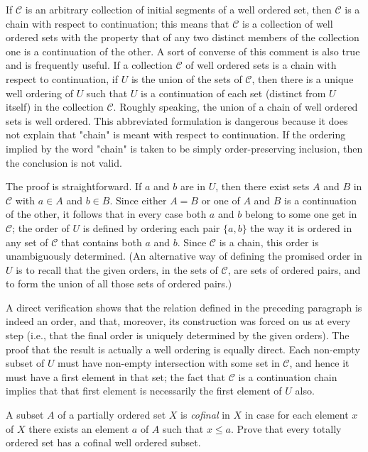 If $\mathcal{C}$ is an arbitrary collection of initial segments of a well ordered set, then $\mathcal{C}$ is a chain with respect to continuation; this means that $\mathcal{C}$ is a collection of well ordered sets with the property that of any two distinct members of the collection one is a continuation of the other. A sort of converse of this comment is also true and is frequently useful. If a collection $\mathcal{C}$ of well ordered sets is a chain with respect to continuation, if $U$ is the union of the sets of $\mathcal{C}$, then there is a unique well ordering of $U$ such that $U$ is a continuation of each set (distinct from $U$ itself) in the collection $\mathcal{C}$. Roughly speaking, the union of a chain of well ordered sets is well ordered. This abbreviated formulation is dangerous because it does not explain that "chain" is meant with respect to continuation. If the ordering implied by the word "chain" is taken to be simply order-preserving inclusion, then the conclusion is not valid. 

The proof is straightforward. If $a$ and $b$ are in $U$, then there exist sets $A$ and $B$ in $\mathcal{C}$ with $a \in A$ and $b \in B$. Since either $A = B$ or one of $A$ and $B$ is a continuation of the other, it follows that in every case both $a$ and $b$ belong to some one get in $\mathcal{C}$; the order of $U$ is defined by ordering each pair $\{ a,b \}$ the way it is ordered in any set of $\mathcal{C}$ that contains both $a$ and $b$. Since $\mathcal{C}$ is a chain, this order is unambiguously determined. (An alternative way of defining the promised order in $U$ is to recall that the given orders, in the sets of $\mathcal{C}$, are sets of ordered pairs, and to form the union of all those sets of ordered pairs.) 

A direct verification shows that the relation defined in the preceding paragraph is indeed an order, and that, moreover, its  construction was forced on us at every step (i.e., that the final order is uniquely determined by the given orders). The proof that the result is actually a well ordering is equally direct. Each non-empty subset of $U$ must have non-empty intersection with some set in $\mathcal{C}$, and hence it must have a first element in that set; the fact that $\mathcal{C}$ is a continuation chain implies that that first element is necessarily the first element of $U$ also. 

\begin{exercise} A subset $A$ of a partially ordered set $X$ is \textit{cofinal} in $X$ in case for each element $x$ of $X$ there exists an element $a$ of $A$ such that $x \le a$. Prove that every totally ordered set has a cofinal well ordered subset.
\end{exercise}


